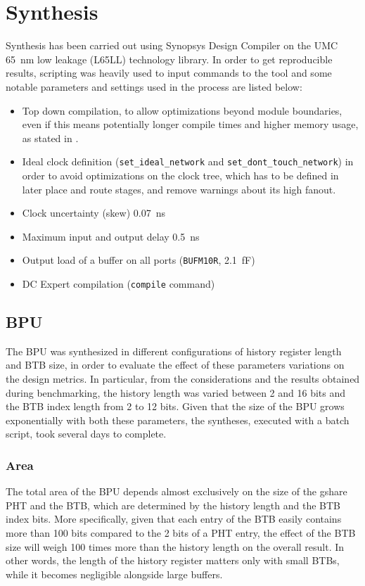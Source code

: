 \section{Synthesis}
Synthesis has been carried out using Synopsys Design Compiler on the UMC \SI{65}{nm} low leakage (L65LL) technology library. In order to get reproducible results, scripting was heavily used to input commands to the tool and some notable parameters and settings used in the process are listed below:
\begin{itemize}
  \item Top down compilation, to allow optimizations beyond module boundaries, even if this means potentially longer compile times and higher memory usage, as stated in \cite[p.8-6]{dc}.
  \item Ideal clock definition (\texttt{set\_ideal\_network} and \texttt{set\_dont\_touch\_network}) in order to avoid optimizations on the clock tree, which has to be defined in later place and route stages, and remove warnings about its high fanout.
  \item Clock uncertainty (skew) \SI{0.07}{ns}
  \item Maximum input and output delay \SI{0.5}{ns}
  \item Output load of a buffer on all ports (\texttt{BUFM10R}, \SI{2.1}{\femto\farad})
  \item DC Expert compilation (\texttt{compile} command)
\end{itemize}

\subsection{\acs{BPU}}
The \ac{BPU} was synthesized in different configurations of history register length and \ac{BTB} size, in order to evaluate the effect of these parameters variations on the design metrics. In particular, from the considerations and the results obtained during benchmarking, the history length was varied between 2 and 16 bits and the \ac{BTB} index length from 2 to 12 bits. Given that the size of the \ac{BPU} grows exponentially with both these parameters, the syntheses, executed with a batch script, took several days to complete.

\subsubsection{Area}
The total area of the \ac{BPU} depends almost exclusively on the size of the gshare \ac{PHT} and the \ac{BTB}, which are determined by the history length and the \ac{BTB} index bits. More specifically, given that each entry of the \ac{BTB} easily contains more than 100 bits compared to the 2 bits of a \ac{PHT} entry, the effect of the \ac{BTB} size will weigh 100 times more than the history length on the overall result. In other words, the length of the history register matters only with small \acp{BTB}, while it becomes negligible alongside large buffers.

